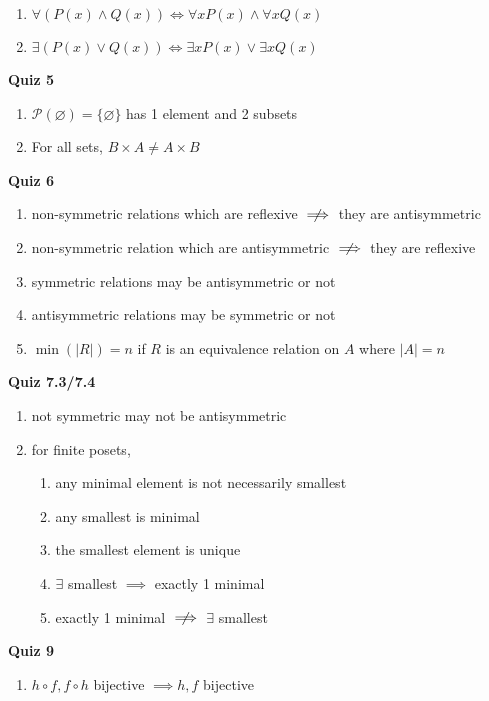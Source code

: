 \documentclass[landscape, a4paper]{article}
\newcommand{\Or}{\vee}
\renewcommand{\P}{\mathcal{P}}
\renewcommand{\and}{\wedge}
\newcommand{\heading}[1]{
    \noindent\textbf{#1}
}
\begin{document}
\begin{multicols*}{4}
\begin{enumerate}
        \item $\forall (P(x) \and Q(x)) \iff \forall x P(x)\and \forall x Q(x)$
        \item $\exists (P(x) \Or Q(x)) \iff \exists x P(x)\Or \exists x Q(x)$
    \end{enumerate}
    \heading{Quiz 5}
    \begin{enumerate}
        \item $\P(\varnothing)=\{\varnothing\}$ has 1 element and 2 subsets
        \item For all sets, $B\times A \neq A \times B$
    \end{enumerate}
    \heading{Quiz 6}
    \begin{enumerate}
        \item non-symmetric relations which are reflexive $\centernot\implies$ they are antisymmetric
        \item non-symmetric relation which are antisymmetric $\centernot\implies$ they are reflexive
        \item symmetric relations may be antisymmetric or not
        \item antisymmetric relations may be symmetric or not
        \item $\min(|R|)=n$ if $R$ is an equivalence relation on $A$ where $|A|=n$
    \end{enumerate}
    \heading{Quiz 7.3/7.4}
    \begin{enumerate}
        \item not symmetric may not be antisymmetric
        \item for finite posets,
              \begin{enumerate}[wide]
                  \item any minimal element is not necessarily smallest
                  \item any smallest is minimal
                  \item the smallest element is unique
                  \item $\exists$ smallest $\implies$ exactly 1 minimal
                  \item exactly 1 minimal $\centernot\implies$ $\exists$ smallest
              \end{enumerate}
    \end{enumerate}
    \heading{Quiz 9}
    \begin{enumerate}
        \item $h\circ f, f\circ h$ bijective $\implies h, f$ bijective
    \end{enumerate}

\end{multicols*}
\end{document}
